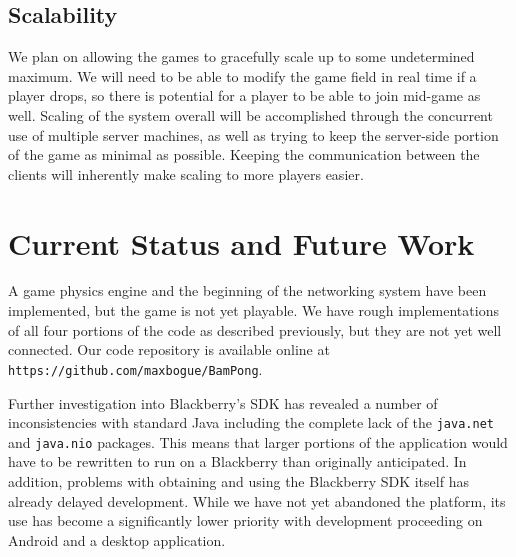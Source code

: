 \documentclass{sig-alternate}
\begin{document}
\subsection{Scalability}

We plan on allowing the games to gracefully scale up to some undetermined
maximum.  We will need to be able to modify the game field in real time if
a player drops, so there is potential for a player to be able to join
mid-game as well.   Scaling of the system overall will be accomplished
through the concurrent use of multiple server machines, as well as trying
to keep the server-side portion of the game as minimal as possible.
Keeping the communication between the clients will inherently make scaling
to more players easier.



\section{Current Status and Future Work}
\label{current status}


A game physics engine and the beginning of the networking system have been
implemented, but the game is not yet playable.  We have rough
implementations of all four portions of the code as described previously,
but they are not yet well connected.  Our code repository is available
online at \texttt{https://github.com/maxbogue/BamPong}.

Further investigation into Blackberry's SDK has revealed a number of
inconsistencies with standard Java including the complete lack of the
\texttt{java.net} and \texttt{java.nio} packages.  This means that larger
portions of the application would have to be rewritten to run on a
Blackberry than originally anticipated.  In addition, problems with
obtaining and using the Blackberry SDK itself has already delayed
development.  While we have not yet abandoned the platform, its use has
become a significantly lower priority with development proceeding on
Android and a desktop application.



\balance
\end{document}
